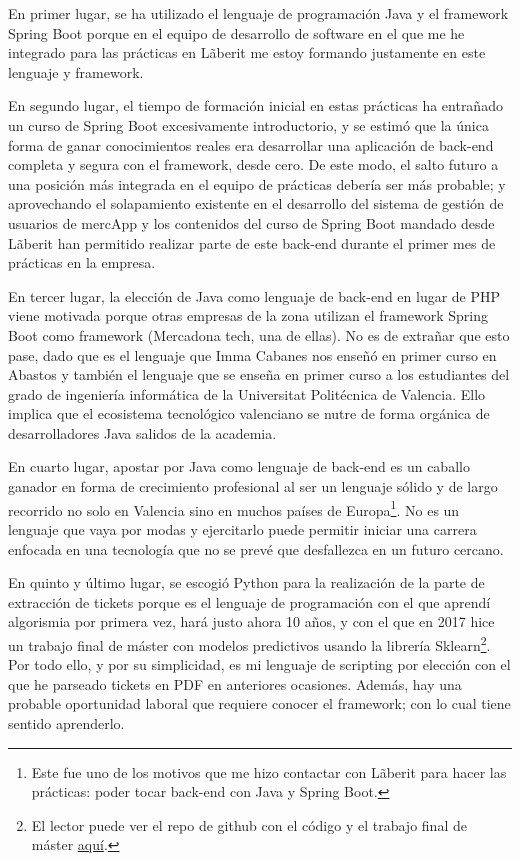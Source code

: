 \documentclass[a4paper,12pt]{report}
\begin{document}
		En primer lugar, se ha utilizado el lenguaje de programación Java y el framework Spring Boot porque en el equipo de desarrollo de software en el que me he integrado para las prácticas en Lãberit me estoy formando justamente en este lenguaje y framework. 
		
		En segundo lugar, el tiempo de formación inicial en estas prácticas ha entrañado un curso de Spring Boot excesivamente introductorio, y se estimó que la única forma de ganar conocimientos reales era desarrollar una aplicación de back-end completa y segura con el framework, desde cero. De este modo, el salto futuro a una posición más integrada en el equipo de prácticas debería ser más probable; y aprovechando el solapamiento existente en el desarrollo del sistema de gestión de usuarios de mercApp y los contenidos del curso de Spring Boot mandado desde Lãberit han permitido realizar parte de este back-end durante el primer mes de prácticas en la empresa.
			
		En tercer lugar, la elección de Java como lenguaje de back-end en lugar de PHP viene motivada porque otras empresas de la zona utilizan el framework Spring Boot como framework (Mercadona tech, una de ellas). No es de extrañar que esto pase, dado que es el lenguaje que Imma Cabanes nos enseñó en primer curso en Abastos y también el lenguaje que se enseña en primer curso a los estudiantes del grado de ingeniería informática de la Universitat Politécnica de Valencia. Ello implica que el ecosistema tecnológico valenciano se nutre de forma orgánica de desarrolladores Java salidos de la academia.
		
		En cuarto lugar, apostar por Java como lenguaje de back-end es un caballo ganador en forma de crecimiento profesional al ser un lenguaje sólido y de largo recorrido no solo en Valencia sino en muchos países de Europa\footnote{Este fue uno de los motivos que me hizo contactar con Lãberit para hacer las prácticas: poder tocar back-end con Java y Spring Boot.}. No es un lenguaje que vaya por modas y ejercitarlo puede permitir iniciar una carrera enfocada en una tecnología que no se prevé que desfallezca en un futuro cercano.
		
		En quinto y último lugar, se escogió Python para la realización de la parte de extracción de tickets porque es el lenguaje de programación con el que aprendí algorismia por primera vez, hará justo ahora 10 años, y con el que en 2017 hice un trabajo final de máster con modelos predictivos usando la librería Sklearn\footnote{El lector puede ver el repo de github con el código y el trabajo final de máster \href{https://github.com/blackcub3s/MSc-FinalThesis}{aquí}.}. Por todo ello, y por su simplicidad, es mi lenguaje de scripting por elección con el que he parseado tickets en PDF en anteriores ocasiones. Además, hay una probable oportunidad laboral que requiere conocer el framework; con lo cual tiene sentido aprenderlo.
		
\end{document}
